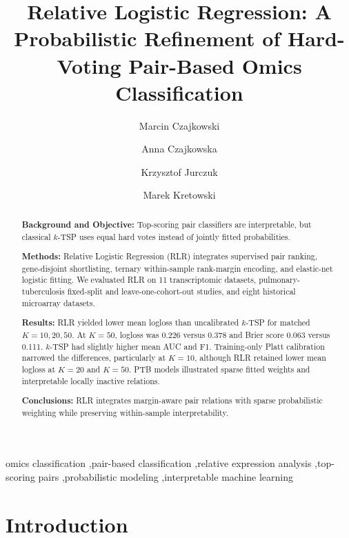\documentclass[preprint,12pt,a4paper]{elsarticle}
\begin{document}
\begin{frontmatter}
\title{Relative Logistic Regression: A Probabilistic Refinement of Hard-Voting Pair-Based Omics Classification}
\author[pb]{Marcin Czajkowski}
\author[umb]{Anna Czajkowska}
\author[pb]{Krzysztof Jurczuk}
\author[pb]{Marek Kretowski}
\address[pb]{Faculty of Computer Science, Bialystok University of Technology, 15-351 Bialystok, Poland}
\address[umb]{Department of Medical Biology, Medical University of Bialystok, Bialystok, Poland}
\begin{abstract}
\textbf{Background and Objective:}
Top-scoring pair classifiers are interpretable, but classical $k$-TSP uses equal hard votes instead of jointly fitted probabilities.

\textbf{Methods:}
Relative Logistic Regression (RLR) integrates supervised pair ranking, gene-disjoint shortlisting, ternary within-sample rank-margin encoding, and elastic-net logistic fitting. We evaluated RLR on 11 transcriptomic datasets, pulmonary-tuberculosis fixed-split and leave-one-cohort-out studies, and eight historical microarray datasets.

\textbf{Results:}
RLR yielded lower mean logloss than uncalibrated $k$-TSP for matched $K=10,20,50$. At $K=50$, logloss was 0.226 versus 0.378 and Brier score 0.063 versus 0.111. $k$-TSP had slightly higher mean AUC and F1. Training-only Platt calibration narrowed the differences, particularly at $K=10$, although RLR retained lower mean logloss at $K=20$ and $K=50$. PTB models illustrated sparse fitted weights and interpretable locally inactive relations.

\textbf{Conclusions:}
RLR integrates margin-aware pair relations with sparse probabilistic weighting while preserving within-sample interpretability.
\end{abstract}
\begin{keyword}
omics classification \sep pair-based classification \sep relative expression analysis \sep top-scoring pairs \sep probabilistic modeling \sep interpretable machine learning
\end{keyword}
\end{frontmatter}
\section{Introduction}
\end{document}
